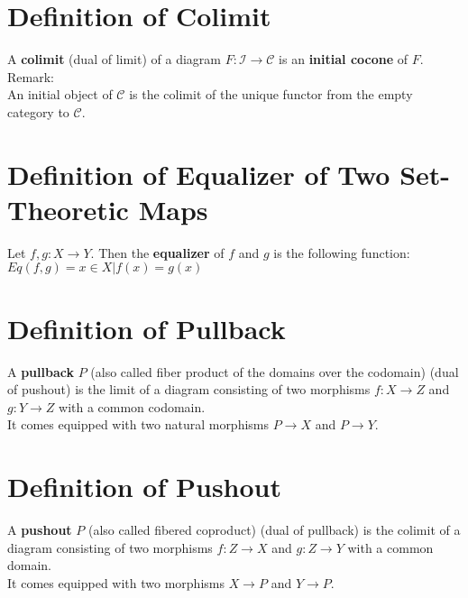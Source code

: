 \documentclass[a4paper, twoside, english, 11pt]{book}
\newcommand{\C}{\mathcal C}
\newcommand{\I}{\mathcal I}
\begin{document}
\section{Definition of Colimit}

A \textbf{colimit} (dual of limit) of a diagram $F : \I \rightarrow \C$ is an \textbf{initial cocone} of $F$. \\

\noindent
Remark: \\
An initial object of $\C$ is the colimit of the unique functor from the empty category to $\C$.



\section{Definition of Equalizer of Two Set-Theoretic Maps}

Let $f, g : X \rightarrow Y$. Then the \textbf{equalizer} of $f$ and $g$ is the following function: \\

$Eq(f, g) = {x \in X | f(x) = g(x)}$



\section{Definition of Pullback}

A \textbf{pullback} $P$ (also called fiber product of the domains over the codomain) (dual of pushout) is the limit of a diagram consisting of two morphisms $f : X \rightarrow Z$ and $g : Y \rightarrow Z$ with a common codomain. \\

\noindent
It comes equipped with two natural morphisms $P \rightarrow X$ and $P \rightarrow Y$.



\section{Definition of Pushout}

A \textbf{pushout} $P$ (also called fibered coproduct) (dual of pullback) is the colimit of a diagram consisting of two morphisms $f : Z \rightarrow X$ and $g : Z \rightarrow Y$ with a common domain. \\

\noindent
It comes equipped with two morphisms $X \rightarrow P$ and $Y \rightarrow P$.
\end{document}

